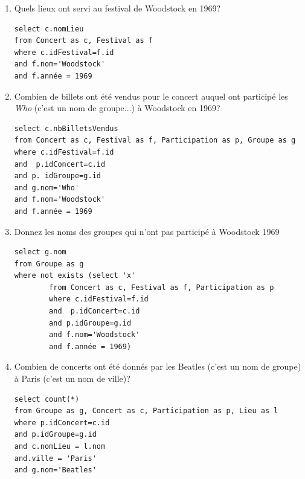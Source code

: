 \begin{enumerate}

\item Quels lieux ont servi au festival de Woodstock en 1969?

\begin{solution}
\begin{verbatim}
select c.nomLieu
from Concert as c, Festival as f
where c.idFestival=f.id
and f.nom='Woodstock'
and f.année = 1969
\end{verbatim}
\end{solution}

\item Combien de billets ont été vendus pour le concert auquel ont participé les \textit{Who}
(c'est un nom de groupe...) à Woodstock en 1969?

\begin{solution}
\begin{verbatim}
select c.nbBilletsVendus
from Concert as c, Festival as f, Participation as p, Groupe as g
where c.idFestival=f.id
and  p.idConcert=c.id
and p. idGroupe=g.id
and g.nom='Who'
and f.nom='Woodstock'
and f.année = 1969
\end{verbatim}
\end{solution}

\item Donnez les noms des groupes qui n'ont pas participé à Woodstock 1969

\begin{solution}
\begin{verbatim}
select g.nom
from Groupe as g
where not exists (select 'x' 
        from Concert as c, Festival as f, Participation as p
        where c.idFestival=f.id
        and  p.idConcert=c.id
        and p.idGroupe=g.id
        and f.nom='Woodstock'
        and f.année = 1969)
\end{verbatim}
\end{solution}


\item Combien de concerts ont été donnés par les Beatles  (c'est un nom de groupe) à Paris
(c'est un nom de ville)?

\begin{solution}
\begin{verbatim}
select count(*)
from Groupe as g, Concert as c, Participation as p, Lieu as l
where p.idConcert=c.id
and p.idGroupe=g.id
and c.nomLieu = l.nom
and.ville = 'Paris'
and g.nom='Beatles'
\end{verbatim}
\end{solution}


\end{enumerate}
